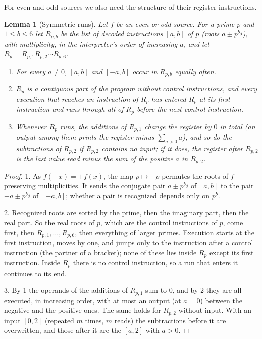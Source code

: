 \documentclass[11pt]{article}
\newtheorem{lemma}[theorem]{Lemma}
\theoremstyle{remark}
\begin{document}
For even and odd sources we also need the structure of their register instructions.

\begin{lemma}[Symmetric runs]\label{lem:symruns}
Let $f$ be an even or odd source.  For a prime $p$ and $1\le b\le6$ let $R_{p,b}$ be the
list of decoded instructions $[a,b]$ of $p$ (roots $a\pm p^bi$), with multiplicity, in the
interpreter's order of increasing $a$, and let $R_p=R_{p,1}R_{p,2}\cdots R_{p,6}$.
\begin{enumerate}
\item For every $a\ne0$, $[a,b]$ and $[-a,b]$ occur in $R_{p,b}$ equally often.
\item $R_p$ is a contiguous part of the program without control instructions, and every
execution that reaches an instruction of $R_p$ has entered $R_p$ at its first instruction
and runs through all of $R_p$ before the next control instruction.
\item Whenever $R_p$ runs, the additions of $R_{p,1}$ change the register by $0$ in total
(an output among them prints the register minus $\sum_{a>0}a$), and so do the
subtractions of $R_{p,2}$ if $R_{p,2}$ contains no input; if it does, the register after
$R_{p,2}$ is the last value read minus the sum of the positive $a$ in $R_{p,2}$.
\end{enumerate}
\end{lemma}

\begin{proof}
1.  As $f(-x)=\pm f(x)$, the map $\rho\mapsto-\rho$ permutes the roots of $f$ preserving
multiplicities.  It sends the conjugate pair $a\pm p^bi$ of $[a,b]$ to the pair
$-a\pm p^bi$ of $[-a,b]$; whether a pair is recognized depends only on $p^b$.

2.  Recognized roots are sorted by the prime, then the imaginary part, then the real
part.  So the real roots of $p$, which are the control instructions of $p$, come first,
then $R_{p,1},\dots,R_{p,6}$, then everything of larger primes.  Execution starts at the
first instruction, moves by one, and jumps only to the instruction after a control
instruction (the partner of a bracket); none of these lies inside $R_p$ except its first
instruction.  Inside $R_p$ there is no control instruction, so a run that enters it
continues to its end.

3.  By 1 the operands of the additions of $R_{p,1}$ sum to $0$, and by 2 they are all
executed, in increasing order, with at most an output (at $a=0$) between the negative and
the positive ones.  The same holds for $R_{p,2}$ without input.  With an input $[0,2]$
(repeated $m$ times, $m$ reads) the subtractions before it are overwritten, and those after
it are the $[a,2]$ with $a>0$.
\end{proof}
\end{document}
